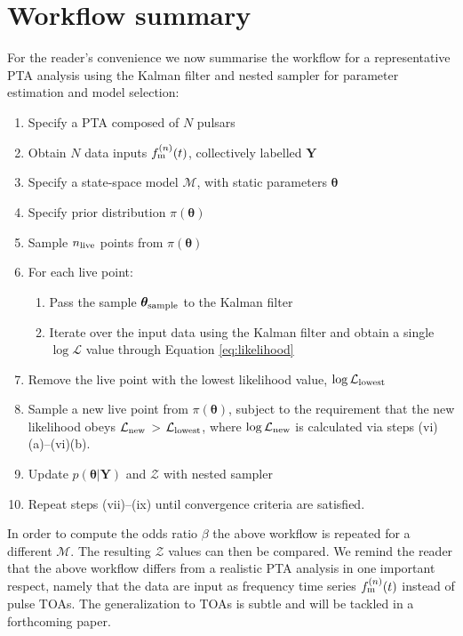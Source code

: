 \documentclass[fleqn,usenatbib,useAMS]{mnras}
\begin{document}
\section{Workflow summary}\label{sec:workflow}
For the reader's convenience we now summarise the workflow for a representative PTA analysis using the Kalman filter and nested sampler for parameter estimation and model selection:
\begin{enumerate}[leftmargin=2em]
	\item Specify a PTA composed of $N$ pulsars 
	\item Obtain $N$ data inputs $f_{\rm m}^{(n)}(t)$, collectively labelled $\boldsymbol{Y}$
	\item Specify a state-space model $\mathcal{M}$, with static parameters $\boldsymbol{\theta}$
	\item Specify prior distribution $\pi(\boldsymbol{\theta})$
	\item Sample $n_{\rm live}$ points from $\pi(\boldsymbol{\theta})$ 
	\item For each live point:
	\begin{enumerate}[leftmargin=2em]
		\item Pass the sample $\boldsymbol{\theta}_{\rm sample}$ to the Kalman filter
		\item Iterate over the input data using the Kalman filter and obtain a single $\log \mathcal{L}$ value through Equation \eqref{eq:likelihood}
	\end{enumerate}
	\item Remove the live point with the lowest likelihood value, $\log \mathcal{L}_{\rm lowest}$
	\item Sample a new live point from $\pi(\boldsymbol{\theta})$, subject to the requirement that the new likelihood obeys $\mathcal{L}_{\rm new}$ > $\mathcal{L}_{\rm lowest}$, where $\log \mathcal{L}_{\rm new}$ is calculated via steps (vi)(a)--(vi)(b).
	\item Update $p\left(\boldsymbol{\theta}|\boldsymbol{Y}\right)$ and $\mathcal{Z}$ with nested sampler
	\item Repeat steps (vii)--(ix) until convergence criteria are satisfied.
\end{enumerate}
In order to compute the odds ratio $\beta$ the above workflow is repeated for a different $\mathcal{M}$. The resulting $\mathcal{Z}$ values can then be compared. We remind the reader that the above workflow differs from a realistic PTA analysis in one important respect, namely that the data are input as frequency time series $f_{\rm m}^{(n)}(t)$ instead of pulse TOAs. The generalization to TOAs is subtle and will be tackled in a forthcoming paper.
\end{document}
